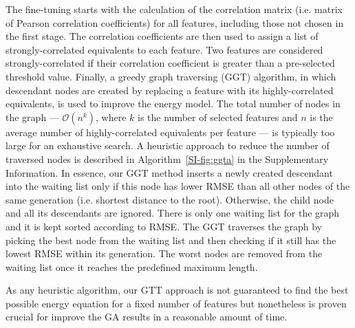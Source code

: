 \documentclass[aip,jcp,reprint,amsmath,amssymb,nature]{revtex4-1}
\begin{document}
The fine-tuning starts with the calculation of the correlation matrix (i.e. matrix of Pearson correlation coefficients) for all features, including those not chosen in the first stage. 
The correlation coefficients are then used to assign a list of strongly-correlated equivalents to each feature. 
Two features are considered strongly-correlated if their correlation coefficient is greater than a pre-selected threshold value. 
Finally, a greedy graph traversing (GGT) algorithm, in which descendant nodes are created by replacing a feature with its highly-correlated equivalents, is used to improve the energy model. 
The total number of nodes in the graph --- $\mathcal{O}(n^k)$, where $k$ is the number of selected features and $n$ is the average number of highly-correlated equivalents per feature --- is typically too large for an exhaustive search. 
A heuristic approach to reduce the number of traversed nodes is described in Algorithm~\ref{SI-fig:ggta} in the Supplementary Information. 
In essence, our GGT method inserts a newly created descendant into the waiting list only if this node has lower RMSE than all other nodes of the same generation (i.e. shortest distance to the root). 
Otherwise, the child node and all its descendants are ignored. 
There is only one waiting list for the graph and it is kept sorted according to RMSE. 
The GGT traverses the graph by picking the best node from the waiting list and then checking if it still has the lowest RMSE within its generation. 
The worst nodes are removed from the waiting list once it reaches the predefined maximum length. 

As any heuristic algorithm, our GTT approach is not guaranteed to find the best possible energy equation for a fixed number of features but nonetheless is proven crucial for improve the GA results in a reasonable amount of time.

\end{document}
